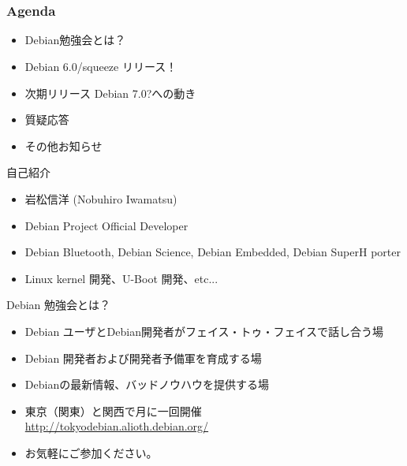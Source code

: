 \frame{\titlepage{}}

\section{}
\begin{frame}
 \frametitle{Agenda}
 \begin{itemize}
  \item Debian勉強会とは？
  \item Debian 6.0/squeeze リリース！
  \item 次期リリース Debian 7.0?への動き 
  \item 質疑応答
  \item その他お知らせ
 \end{itemize}
\end{frame}

\begin{frame}{自己紹介}
\begin{itemize}
\item 岩松信洋 (Nobuhiro Iwamatsu)
\item Debian Project Official Developer
\item Debian Bluetooth, Debian Science, Debian Embedded, Debian SuperH
      porter
\item Linux kernel 開発、U-Boot 開発、etc...
\end{itemize}
\end{frame}


\begin{frame}{Debian 勉強会とは？}
\begin{itemize}
\item Debian ユーザとDebian開発者がフェイス・トゥ・フェイスで話し合う場
\item Debian 開発者および開発者予備軍を育成する場
\item Debianの最新情報、バッドノウハウを提供する場
\item 東京（関東）と関西で月に一回開催\\
\url{http://tokyodebian.alioth.debian.org/}
\item お気軽にご参加ください。
\end{itemize}
\end{frame}


